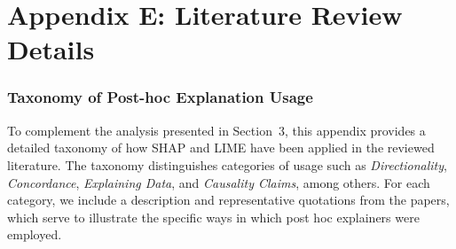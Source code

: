\documentclass[mnsc,blindrev]{informs3}
\begin{document}
            


\FloatBarrier
\section*{Appendix E: Literature Review Details}
\subsubsection{Taxonomy of Post-hoc Explanation Usage} To complement the analysis presented in Section~3, this appendix provides a detailed taxonomy of how SHAP and LIME have been applied in the reviewed literature. The taxonomy distinguishes categories of usage such as \textit{Directionality}, \textit{Concordance}, \textit{Explaining Data}, and \textit{Causality Claims}, among others. For each category, we include a description and representative quotations from the papers, which serve to illustrate the specific ways in which post hoc explainers were employed.
\end{document}

